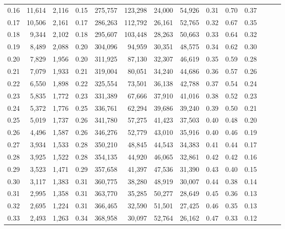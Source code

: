 \begin{tabular}{rrrrrrrrrrrrrr}
0.16 &  11,614 &  2,116 &  0.15 &  275,757 &  123,298 &  24,000 &  54,926 &  0.31 &  0.70 &      0.37 \\
0.17 &  10,506 &  2,161 &  0.17 &  286,263 &  112,792 &  26,161 &  52,765 &  0.32 &  0.67 &      0.35 \\
0.18 &   9,344 &  2,102 &  0.18 &  295,607 &  103,448 &  28,263 &  50,663 &  0.33 &  0.64 &      0.32 \\
0.19 &   8,489 &  2,088 &  0.20 &  304,096 &   94,959 &  30,351 &  48,575 &  0.34 &  0.62 &      0.30 \\
0.20 &   7,829 &  1,956 &  0.20 &  311,925 &   87,130 &  32,307 &  46,619 &  0.35 &  0.59 &      0.28 \\
0.21 &   7,079 &  1,933 &  0.21 &  319,004 &   80,051 &  34,240 &  44,686 &  0.36 &  0.57 &      0.26 \\
0.22 &   6,550 &  1,898 &  0.22 &  325,554 &   73,501 &  36,138 &  42,788 &  0.37 &  0.54 &      0.24 \\
0.23 &   5,835 &  1,772 &  0.23 &  331,389 &   67,666 &  37,910 &  41,016 &  0.38 &  0.52 &      0.23 \\
0.24 &   5,372 &  1,776 &  0.25 &  336,761 &   62,294 &  39,686 &  39,240 &  0.39 &  0.50 &      0.21 \\
0.25 &   5,019 &  1,737 &  0.26 &  341,780 &   57,275 &  41,423 &  37,503 &  0.40 &  0.48 &      0.20 \\
0.26 &   4,496 &  1,587 &  0.26 &  346,276 &   52,779 &  43,010 &  35,916 &  0.40 &  0.46 &      0.19 \\
0.27 &   3,934 &  1,533 &  0.28 &  350,210 &   48,845 &  44,543 &  34,383 &  0.41 &  0.44 &      0.17 \\
0.28 &   3,925 &  1,522 &  0.28 &  354,135 &   44,920 &  46,065 &  32,861 &  0.42 &  0.42 &      0.16 \\
0.29 &   3,523 &  1,471 &  0.29 &  357,658 &   41,397 &  47,536 &  31,390 &  0.43 &  0.40 &      0.15 \\
0.30 &   3,117 &  1,383 &  0.31 &  360,775 &   38,280 &  48,919 &  30,007 &  0.44 &  0.38 &      0.14 \\
0.31 &   2,995 &  1,358 &  0.31 &  363,770 &   35,285 &  50,277 &  28,649 &  0.45 &  0.36 &      0.13 \\
0.32 &   2,695 &  1,224 &  0.31 &  366,465 &   32,590 &  51,501 &  27,425 &  0.46 &  0.35 &      0.13 \\
0.33 &   2,493 &  1,263 &  0.34 &  368,958 &   30,097 &  52,764 &  26,162 &  0.47 &  0.33 &      0.12 \\

\end{tabular}
